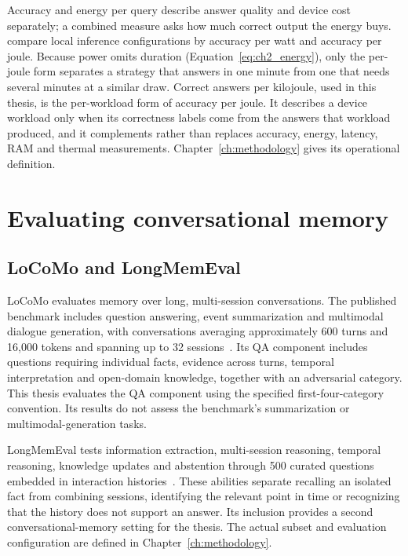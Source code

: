 Accuracy and energy per query describe answer quality and device cost separately; a combined
measure asks how much correct output the energy buys. \citet{intelligence_per_watt} compare local
inference configurations by accuracy per watt and accuracy per joule. Because power omits
duration (Equation~\ref{eq:ch2_energy}), only the per-joule form separates a strategy that answers
in one minute from one that needs several minutes at a similar draw. Correct answers per
kilojoule, used in this thesis, is the per-workload form of accuracy per joule. It describes a
device workload only when its correctness labels come from the answers that workload produced, and
it complements rather than replaces accuracy, energy, latency, RAM and thermal measurements.
Chapter~\ref{ch:methodology} gives its operational definition.

\section{Evaluating conversational memory}
\label{sec:ch2_evaluation}

\subsection{LoCoMo and LongMemEval}

LoCoMo evaluates memory over long, multi-session conversations. The published benchmark
includes question answering, event summarization and multimodal dialogue generation,
with conversations averaging approximately 600 turns and 16,000 tokens and spanning up to
32 sessions~\citep{locomo}. Its QA component includes questions requiring individual
facts, evidence across turns, temporal interpretation and open-domain knowledge, together
with an adversarial category. This thesis evaluates the QA component using the specified
first-four-category convention. Its results do not assess the benchmark's summarization
or multimodal-generation tasks.

LongMemEval tests information extraction, multi-session reasoning, temporal reasoning,
knowledge updates and abstention through 500 curated questions embedded in interaction
histories~\citep{longmemeval}. These abilities separate recalling an isolated fact from
combining sessions, identifying the relevant point in time or recognizing that the history
does not support an answer. Its inclusion provides a second conversational-memory setting
for the thesis. The actual subset and evaluation configuration are defined in
Chapter~\ref{ch:methodology}.

